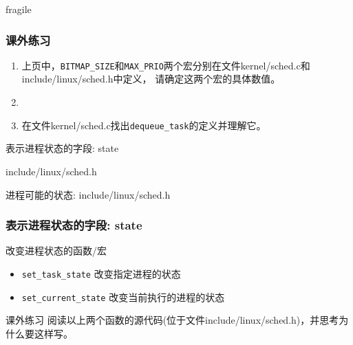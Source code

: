 \documentclass[xcolor=svgnames]{beamer}
\begin{document}
\begin{CJK*}{UTF8}{gbsn}
\begin{frame}{fragile}
\end{frame}

\begin{frame}[fragile]
\frametitle{课外练习}
\begin{enumerate}
\item 上页中，\verb|BITMAP_SIZE|和\verb|MAX_PRIO|两个宏分别在文件kernel/sched.c和include/linux/sched.h中定义，
请确定这两个宏的具体数值。
\item[]
\item 在文件kernel/sched.c找出\verb|dequeue_task|的定义并理解它。
\end{enumerate}
\end{frame}

\begin{frame}{表示进程状态的字段: state}
\begin{block}{include/linux/sched.h}
\lstPCBstate
\end{block}
\begin{block}{进程可能的状态: include/linux/sched.h}
\lststates
\end{block}
\end{frame}

\begin{frame}[fragile]
\frametitle{表示进程状态的字段: state}
\begin{block}{改变进程状态的函数/宏}
\begin{itemize}
\item \verb|set_task_state| 改变指定进程的状态
\item \verb|set_current_state| 改变当前执行的进程的状态
\end{itemize}
\end{block}
\begin{block}{课外练习}
阅读以上两个函数的源代码(位于文件include/linux/sched.h)，并思考为什么要这样写。
\end{block}
\end{frame}

%


\end{CJK*}
\end{document}
